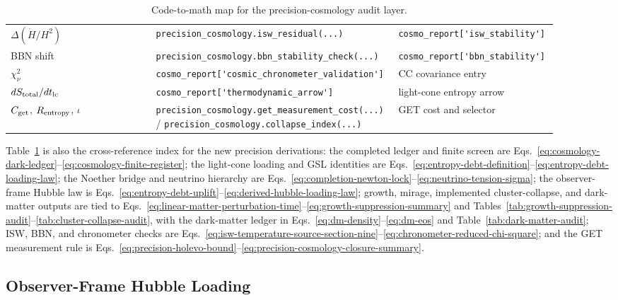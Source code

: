 \documentclass[11pt]{article}
\DeclareRobustCommand{\pyvar}[1]{%
  \ifmmode\text{\nolinkurl{#1}}\else\nolinkurl{#1}\fi%
}
\begin{document}
\begin{table}[htbp]
\begin{tabular}{@{}p{0.26\linewidth}p{0.40\linewidth}p{0.24\linewidth}@{}}
\(\Delta(\dot H/H^2)\) & \pyvar{precision_cosmology.isw_residual(...)} & \pyvar{cosmo_report['isw_stability']} \\
BBN shift & \pyvar{precision_cosmology.bbn_stability_check(...)} & \pyvar{cosmo_report['bbn_stability']} \\
\(\chi^2_{\nu}\) & \pyvar{cosmo_report['cosmic_chronometer_validation']} & CC covariance entry \\
\(dS_{\rm total}/dt_{\rm lc}\) & \pyvar{cosmo_report['thermodynamic_arrow']} & light-cone entropy arrow \\
\(C_{\rm get}\), \(R_{\rm entropy}\), \(\iota\) & \pyvar{precision_cosmology.get_measurement_cost(...)} / \pyvar{precision_cosmology.collapse_index(...)} & GET cost and selector \\
\bottomrule
\end{tabular}
\caption{Code-to-math map for the precision-cosmology audit layer.}
\label{tab:cosmology-code-math-map}
\end{table}

Table~\ref{tab:cosmology-code-math-map} is also the cross-reference index for
the new precision derivations: the completed ledger and finite screen are
Eqs.~\eqref{eq:cosmology-dark-ledger}--\eqref{eq:cosmology-finite-register};
the light-cone loading and GSL identities are
Eqs.~\eqref{eq:entropy-debt-definition}--\eqref{eq:entropy-debt-loading-law};
the Noether bridge and neutrino hierarchy are
Eqs.~\eqref{eq:completion-newton-lock}--\eqref{eq:neutrino-tension-sigma};
the observer-frame Hubble law is
Eqs.~\eqref{eq:entropy-debt-uplift}--\eqref{eq:derived-hubble-loading-law};
growth, mirage, implemented cluster-collapse, and dark-matter outputs are tied to
Eqs.~\eqref{eq:linear-matter-perturbation-time}--\eqref{eq:growth-suppression-summary}
and Tables~\ref{tab:growth-suppression-audit}--\ref{tab:cluster-collapse-audit},
with the dark-matter ledger in Eqs.~\eqref{eq:dm-density}--\eqref{eq:dm-eos}
and Table~\ref{tab:dark-matter-audit};
ISW, BBN, and chronometer checks are
Eqs.~\eqref{eq:isw-temperature-source-section-nine}--\eqref{eq:chronometer-reduced-chi-square};
and the GET measurement rule is
Eqs.~\eqref{eq:precision-holevo-bound}--\eqref{eq:precision-cosmology-closure-summary}.

\subsection{Observer-Frame Hubble Loading}
\end{document}
